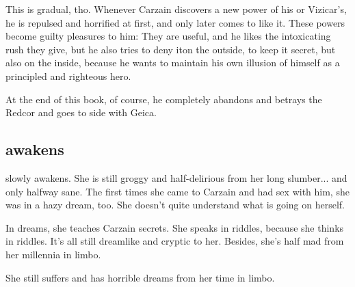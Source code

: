 \begin{garbage}
This is gradual, tho. Whenever Carzain discovers a new power of his or Vizicar's, he is repulsed and horrified at first, and only later comes to like it. These powers become guilty pleasures to him: They are useful, and he likes the intoxicating rush they give, but he also tries to deny it\dash on the outside, to keep it secret, but also on the inside, because he wants to maintain his own illusion of himself as a principled and righteous hero. 

At the end of this book, of course, he completely abandons and betrays the Redcor and goes to side with Geica. 









\subsection{\Belzir{} awakens}
\Belzir{} slowly awakens. 
She is still groggy and half-delirious from her long slumber... and only halfway sane. 
The first times she came to Carzain and had sex with him, she was in a hazy dream, too. 
She doesn't quite understand what is going on herself. 

In dreams, she teaches Carzain secrets. 
She speaks in riddles, because she thinks in riddles. 
It's all still dreamlike and cryptic to her. 
Besides, she's half mad from her millennia in limbo. 


She still suffers and has horrible dreams from her time in limbo. 


\end{garbage}
